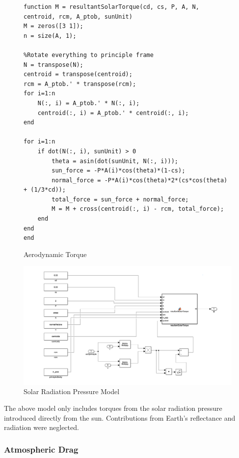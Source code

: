 \begin{figure} [H]
    \centering
    \begin{lstlisting}
function M = resultantSolarTorque(cd, cs, P, A, N, centroid, rcm, A_ptob, sunUnit)
M = zeros([3 1]);
n = size(A, 1);

%Rotate everything to principle frame
N = transpose(N);
centroid = transpose(centroid);
rcm = A_ptob.' * transpose(rcm);
for i=1:n
    N(:, i) = A_ptob.' * N(:, i);
    centroid(:, i) = A_ptob.' * centroid(:, i);
end 

for i=1:n
    if dot(N(:, i), sunUnit) > 0
        theta = asin(dot(sunUnit, N(:, i)));
        sun_force = -P*A(i)*cos(theta)*(1-cs);
        normal_force = -P*A(i)*cos(theta)*2*(cs*cos(theta) + (1/3*cd));
        total_force = sun_force + normal_force;
        M = M + cross(centroid(:, i) - rcm, total_force);
    end
end
end
    \end{lstlisting}
    \caption{Aerodynamic Torque}
    \label{fig:solar_drag_code}
\end{figure}

\begin{figure}[H]
    \centering
    \captionsetup{justification = centering}
    \includegraphics[width = 15cm]{Images/PS5/solarTorqueSimulink.png}
    \caption{Solar Radiation Pressure Model}
    \label{fig:simulink_sol}
\end{figure}

The above model only includes torques from the solar radiation pressure introduced directly from the sun. Contributions from Earth's reflectance and radiation were neglected.


\subsubsection{Atmospheric Drag}

